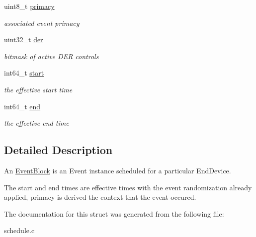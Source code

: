 \begin{DoxyCompactItemize}
\mbox{\label{structEventBlock_a526e1cf5ed438fc4db00a051ad125b00}} 
uint8\+\_\+t \hyperlink{structEventBlock_a526e1cf5ed438fc4db00a051ad125b00}{primacy}
\begin{DoxyCompactList}\small\item\em associated event primacy \end{DoxyCompactList}\item 
\mbox{\label{structEventBlock_ad72299594bd9c924aef2a77b190ea8ae}} 
uint32\+\_\+t \hyperlink{structEventBlock_ad72299594bd9c924aef2a77b190ea8ae}{der}
\begin{DoxyCompactList}\small\item\em bitmask of active D\+ER controls \end{DoxyCompactList}\item 
\mbox{\label{structEventBlock_a8b8ddebee094a509e07f82b542ce3924}} 
int64\+\_\+t \hyperlink{structEventBlock_a8b8ddebee094a509e07f82b542ce3924}{start}
\begin{DoxyCompactList}\small\item\em the effective start time \end{DoxyCompactList}\item 
\mbox{\label{structEventBlock_a7987c8ec7f2cddcb5ab782335c2c1cbb}} 
int64\+\_\+t \hyperlink{structEventBlock_a7987c8ec7f2cddcb5ab782335c2c1cbb}{end}
\begin{DoxyCompactList}\small\item\em the effective end time \end{DoxyCompactList}\end{DoxyCompactItemize}


\subsection{Detailed Description}
An \hyperlink{structEventBlock}{Event\+Block} is an Event instance scheduled for a particular End\+Device. 

The start and end times are effective times with the event randomization already applied, primacy is derived the context that the event occured. 

The documentation for this struct was generated from the following file\+:\begin{DoxyCompactItemize}
\item 
schedule.\+c\end{DoxyCompactItemize}
